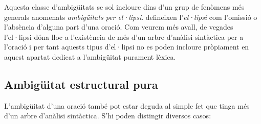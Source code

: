 \begin{enumerate}
  Aquesta classe d'ambigüitats se sol incloure dins d'un grup de
  fenòmens més generals anomenats \emph{ambigüitats per el·lipsi}.
  \citet{alcaraz97b} defineixen l'\emph{el·lipsi}\label{pg:ellipsi}
  com l'omissió o l'absència d'alguna part d'una oració. Com veurem
  més avall, de vegades l'el·lipsi dóna lloc a l'existència de més
  d'un arbre d'anàlisi sintàctica per a l'oració i per tant aquests
  tipus d'el·lipsi no es poden incloure pròpiament en aquest apartat
  dedicat a l'ambigüitat purament lèxica.
\end{enumerate} 

\subsection{Ambigüitat estructural pura}
\label{ss:ambest}
L'ambigüitat d'una oració també pot estar deguda al simple fet que
tinga més d'un arbre d'anàlisi sintàctica. S'hi poden distingir
diversos casos:
